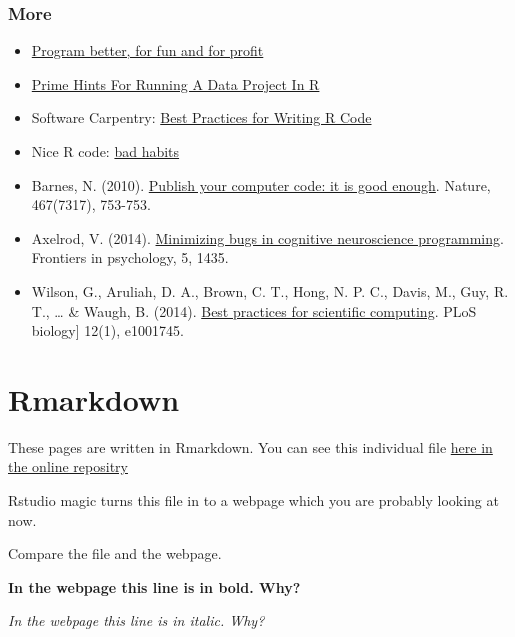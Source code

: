 \documentclass[]{book}
\providecommand{\tightlist}{%
  \setlength{\itemsep}{0pt}\setlength{\parskip}{0pt}}
\begin{document}
\subsection{More}\label{more-1}

\begin{itemize}
\tightlist
\item
  \href{https://inattentionalcoffee.wordpress.com/2017/01/13/program-better-for-fun-and-for-profit/}{Program
  better, for fun and for profit}
\item
  \href{https://kkulma.github.io/2018-03-18-Prime-Hints-for-Running-a-data-project-in-R/}{Prime
  Hints For Running A Data Project In R}
\item
  Software Carpentry:
  \href{https://swcarpentry.github.io/r-novice-inflammation/06-best-practices-R/}{Best
  Practices for Writing R Code}
\item
  Nice R code:
  \href{https://nicercode.github.io/intro/bad-habits.html}{bad habits}
\item
  Barnes, N. (2010).
  \href{https://www.nature.com/articles/467753a}{Publish your computer
  code: it is good enough}. Nature, 467(7317), 753-753.
\item
  Axelrod, V. (2014).
  \href{https://www.frontiersin.org/articles/10.3389/fpsyg.2014.01435/full}{Minimizing
  bugs in cognitive neuroscience programming}. Frontiers in psychology,
  5, 1435.
\item
  Wilson, G., Aruliah, D. A., Brown, C. T., Hong, N. P. C., Davis, M.,
  Guy, R. T., \ldots{} \& Waugh, B. (2014).
  \href{http://journals.plos.org/plosbiology/article?id=10.1371/journal.pbio.1001745}{Best
  practices for scientific computing}. PLoS biology{]} 12(1), e1001745.
\end{itemize}

\chapter{Rmarkdown}\label{rmarkdown}

These pages are written in Rmarkdown. You can see this individual file
\href{https://github.com/tomstafford/psy6422/blob/master/008-rmarkdown.Rmd}{here
in the online repositry}

Rstudio magic turns this file in to a webpage which you are probably
looking at now.

Compare the file and the webpage.

\textbf{In the webpage this line is in bold. Why?}

\emph{In the webpage this line is in italic. Why?}
\end{document}
